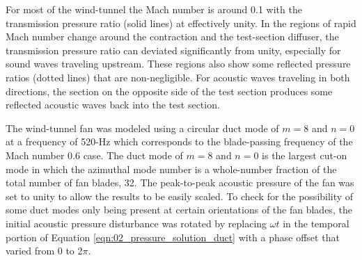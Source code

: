 For most of the wind-tunnel the Mach number is around 0.1 with the transmission pressure ratio (solid lines) at effectively unity.
In the regions of rapid Mach number change around the contraction and the test-section diffuser, the transmission pressure ratio can deviated significantly from unity, especially for sound waves traveling upstream.
These regions also show some reflected pressure ratios (dotted lines) that are non-negligible.
For acoustic waves traveling in both directions, the section on the opposite side of the test section produces some reflected acoustic waves back into the test section.

The wind-tunnel fan was modeled using a circular duct mode of $m=8$ and $n=0$ at a frequency of 520-Hz which corresponds to the blade-passing frequency of the Mach number 0.6 case.
The duct mode of $m=8$ and $n=0$ is the largest cut-on mode in which the azimuthal mode number is a whole-number fraction of the total number of fan blades, 32.
The peak-to-peak acoustic pressure of the fan was set to unity to allow the results to be easily scaled.
To check for the possibility of some duct modes only being present at certain orientations of the fan blades, the initial acoustic pressure disturbance was rotated by replacing $\omega t$ in the temporal portion of Equation \ref{eqn:02_pressure_solution_duct} with a phase offset that varied from 0 to 2$\pi$.

